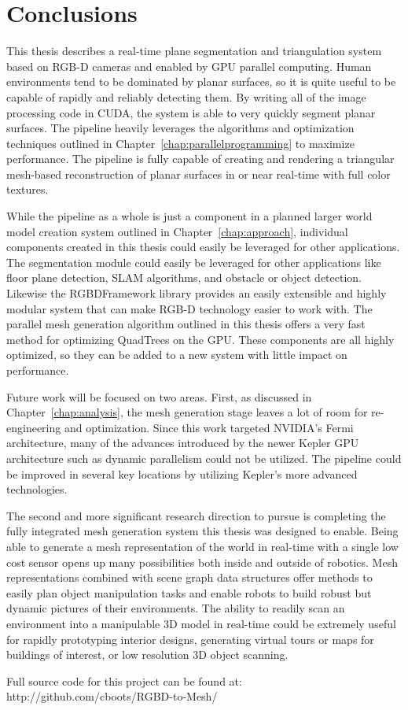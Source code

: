 \chapter{Conclusions}
\label{chap:conclusions}
This thesis describes a real-time plane segmentation and triangulation system based on RGB-D cameras and enabled by GPU parallel computing. Human environments tend to be dominated by planar surfaces, so it is quite useful to be capable of rapidly and reliably detecting them. By writing all of the image processing code in CUDA, the system is able to very quickly segment planar surfaces. The pipeline heavily leverages the algorithms and optimization techniques outlined in Chapter~\ref{chap:parallelprogramming} to maximize performance. The pipeline is fully capable of creating and rendering a triangular mesh-based reconstruction of planar surfaces in or near real-time with full color textures.\par
While the pipeline as a whole is just a component in a planned larger world model creation system outlined in Chapter~\ref{chap:approach}, individual components created in this thesis could easily be leveraged for other applications. The segmentation module could easily be leveraged for other applications like floor plane detection, SLAM algorithms, and obstacle or object detection. Likewise the RGBDFramework library provides an easily extensible and highly modular system that can make RGB-D technology easier to work with. The parallel mesh generation algorithm outlined in this thesis offers a very fast method for optimizing QuadTrees on the GPU. These components are all highly optimized, so they can be added to a new system with little impact on performance.\par
Future work will be focused on two areas. First, as discussed in Chapter~\ref{chap:analysis}, the mesh generation stage leaves a lot of room for re-engineering and optimization. Since this work targeted NVIDIA's Fermi architecture, many of the advances introduced by the newer Kepler GPU architecture such as dynamic parallelism could not be utilized. The pipeline could be improved in several key locations by utilizing Kepler's more advanced technologies.\par
The second and more significant research direction to pursue is completing the fully integrated mesh generation system this thesis was designed to enable. Being able to generate a mesh representation of the world in real-time with a single low cost sensor opens up many possibilities both inside and outside of robotics. Mesh representations combined with scene graph data structures offer methods to easily plan object manipulation tasks and enable robots to build robust but dynamic pictures of their environments. The ability to readily scan an environment into a manipulable 3D model in real-time could be extremely useful for rapidly prototyping interior designs, generating virtual tours or maps for buildings of interest, or low resolution 3D object scanning.

Full source code for this project can be found at: http://github.com/cboots/RGBD-to-Mesh/